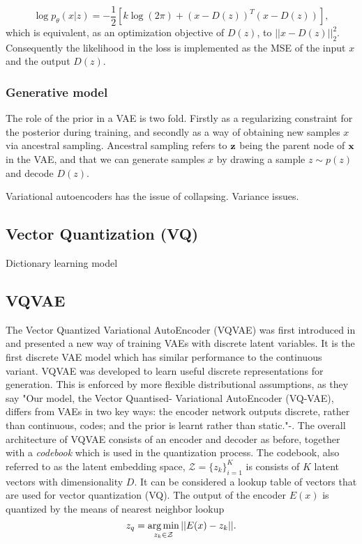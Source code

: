 \documentclass[../../thesis.tex]{subfiles}
\begin{document}
\begin{equation}
    \log p_\theta(x|z) = -\frac12 \left[k\log(2\pi)+ (x-D(z))^T(x-D(z))\right],
\end{equation}
which is equivalent, as an optimization objective of $D(z)$, to $||x-D(z)||_2^2$. Consequently the likelihood in the loss is implemented as the MSE of the input $x$ and the output $D(z)$.

\subsubsection{Generative model}
The role of the prior in a VAE is two fold. Firstly as a regularizing constraint for the posterior during training, and secondly as a way of obtaining new samples $x$ via ancestral sampling. Ancestral sampling refers to $\mathbf{z}$ being the parent node of $\mathbf{x}$ in the VAE, and that we can generate samples $x$ by drawing a sample $z\sim p(z)$ and decode $D(z)$. 




Variational autoencoders has the issue of collapsing. Variance issues.


\subsection{Vector Quantization (VQ)}
Dictionary learning model \cite{Gray1984VQ}

\subsection{VQVAE}
The Vector Quantized Variational AutoEncoder (VQVAE) was first introduced in \cite{VQVAE} and presented a new way of training VAEs with discrete latent variables. It is the first discrete VAE model which has similar performance to the continuous variant. VQVAE was developed to learn useful discrete representations for generation. This is enforced by more flexible distributional assumptions, as they say "Our model, the Vector Quantised-
Variational AutoEncoder (VQ-VAE), differs from VAEs in two key ways: the
encoder network outputs discrete, rather than continuous, codes; and the prior
is learnt rather than static."-\cite{VQVAE}. 
\newline
The overall architecture of VQVAE consists of an encoder and decoder as before, together with a \textit{codebook} which is used in the quantization process. The codebook, also referred to as the latent embedding space, $\mathcal{Z} = \{z_k\}_{i=1}^K$ is consists of $K$ latent vectors with dimensionality $D$. It can be considered a lookup table of vectors that are used for vector quantization (VQ). The output of the encoder $E(x)$ is quantized by the means of nearest neighbor lookup
\begin{equation}
    z_q = \operatorname*{arg\,min}_{z_k\in\mathcal{Z}} ||E(x)-z_k||.
\end{equation}
\end{document}
